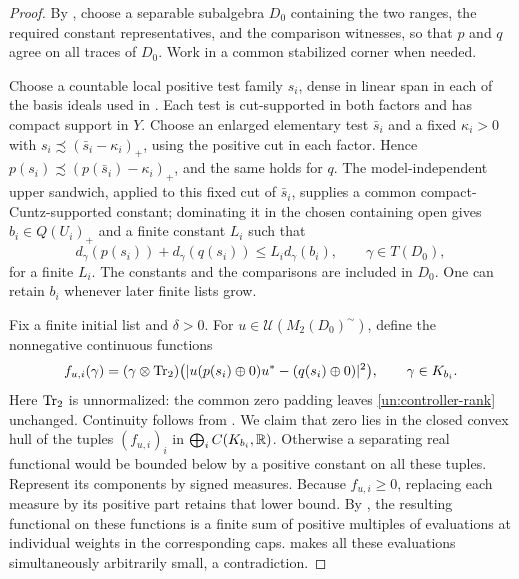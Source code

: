 \begin{proof}
By , choose a separable subalgebra $D_0$ containing
the two ranges, the required constant representatives, and the
comparison witnesses, so that $p$ and $q$ agree on all traces of
$D_0$.  Work in a common stabilized corner when needed.

Choose a countable local positive test family $s_i$, dense in linear
span in each of the basis ideals used in .
Each test is cut-supported in both factors and has compact support
in $Y$. Choose an enlarged elementary test $\bar s_i$ and a fixed
$\kappa_i>0$ with $s_i\precsim(\bar s_i-\kappa_i)_+$, using the
positive cut in each factor. Hence
$p(s_i)\precsim(p(\bar s_i)-\kappa_i)_+$, and the same holds for $q$.
The model-independent upper sandwich, applied to this fixed cut of
$\bar s_i$, supplies a common compact-Cuntz-supported constant;
dominating it in the chosen containing open gives
$b_i\in Q(U_i)_+$ and a finite constant $L_i$ such that
\begin{equation}\label{un:controller-rank}
 d_\gamma(p(s_i))+d_\gamma(q(s_i))
 \leq L_i d_\gamma(b_i),\qquad\gamma\in T(D_0),
\end{equation}
for a finite $L_i$.  The constants and the comparisons are included
in $D_0$.  One can retain $b_i$ whenever later finite lists grow.

Fix a finite initial list and $\delta>0$.  For
$u\in\mathcal U(M_2(D_0)^{\sim})$, define the nonnegative continuous
functions
\[
 f_{u,i}(\gamma)
 =(\gamma\otimes\operatorname{Tr}_2)
 \bigl(\lvert u(p(s_i)\oplus0)u^*-(q(s_i)\oplus0)\rvert^2\bigr),
 \qquad \gamma\in K_{b_i}.
\]
Here $\operatorname{Tr}_2$ is unnormalized: the common zero padding leaves
\eqref{un:controller-rank} unchanged.  Continuity follows from
.  We claim that zero lies
in the closed convex hull of the tuples $(f_{u,i})_i$ in
$\bigoplus_i C(K_{b_i},\mathbb R)$.  Otherwise a separating real functional
would be bounded below by a positive constant on all these tuples.
Represent its components by signed measures.  Because $f_{u,i}\geq0$,
replacing each measure by its positive part retains that lower bound.
By , the resulting functional on these functions
is a finite sum of positive multiples of evaluations at individual
weights in the corresponding caps.   makes
all these evaluations simultaneously arbitrarily small, a
contradiction.


\end{proof}
